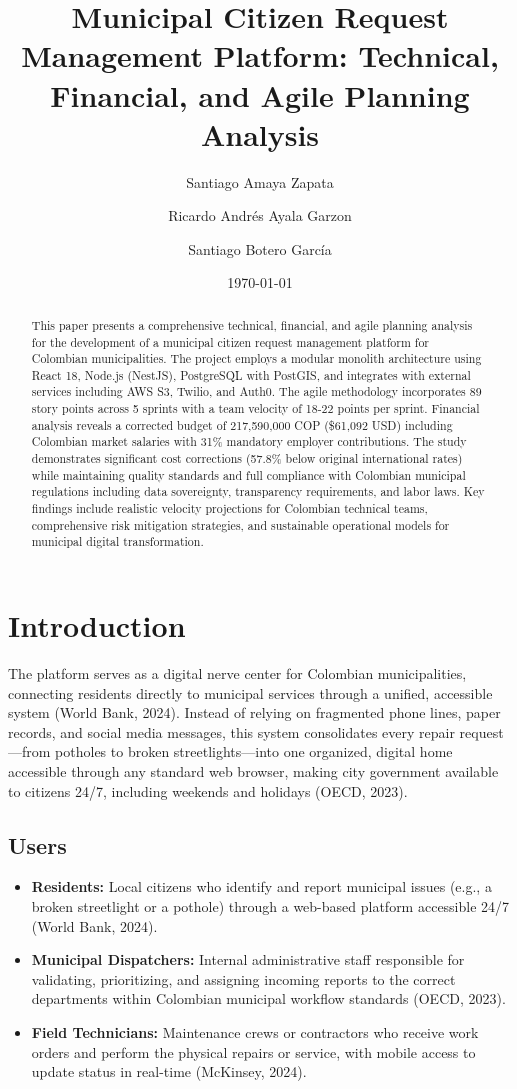 \documentclass[12pt,a4paper]{article}
\title{Municipal Citizen Request Management Platform: Technical, Financial, and Agile Planning Analysis}
\author[1]{Santiago Amaya Zapata}
\author[2]{Ricardo Andrés Ayala Garzon}
\author[3]{Santiago Botero García}
\affil[1,2,3]{Escuela Colombiana de Ingeniería Julio Garavito}
\affil[ ]{\small \texttt{\{santiago.amaya-z, ricardo.ayala-g, santiago.botero-g\}@mail.escuelaing.edu.co}}
\date{\today}
\begin{document}
\maketitle

\begin{abstract}
This paper presents a comprehensive technical, financial, and agile planning analysis for the development of a municipal citizen request management platform for Colombian municipalities. The project employs a modular monolith architecture using React 18, Node.js (NestJS), PostgreSQL with PostGIS, and integrates with external services including AWS S3, Twilio, and Auth0. The agile methodology incorporates 89 story points across 5 sprints with a team velocity of 18-22 points per sprint. Financial analysis reveals a corrected budget of 217,590,000 COP (\$61,092 USD) including Colombian market salaries with 31\% mandatory employer contributions. The study demonstrates significant cost corrections (57.8\% below original international rates) while maintaining quality standards and full compliance with Colombian municipal regulations including data sovereignty, transparency requirements, and labor laws. Key findings include realistic velocity projections for Colombian technical teams, comprehensive risk mitigation strategies, and sustainable operational models for municipal digital transformation.
\end{abstract}

\section{Introduction}

The platform serves as a digital nerve center for Colombian municipalities, connecting residents directly to municipal services through a unified, accessible system (World Bank, 2024). Instead of relying on fragmented phone lines, paper records, and social media messages, this system consolidates every repair request—from potholes to broken streetlights—into one organized, digital home accessible through any standard web browser, making city government available to citizens 24/7, including weekends and holidays (OECD, 2023).

\subsection{Users}

\begin{itemize}
    \item \textbf{Residents:} Local citizens who identify and report municipal issues (e.g., a broken streetlight or a pothole) through a web-based platform accessible 24/7 (World Bank, 2024).
    \item \textbf{Municipal Dispatchers:} Internal administrative staff responsible for validating, prioritizing, and assigning incoming reports to the correct departments within Colombian municipal workflow standards (OECD, 2023).
    \item \textbf{Field Technicians:} Maintenance crews or contractors who receive work orders and perform the physical repairs or service, with mobile access to update status in real-time (McKinsey, 2024).
\end{itemize}
\end{document}
